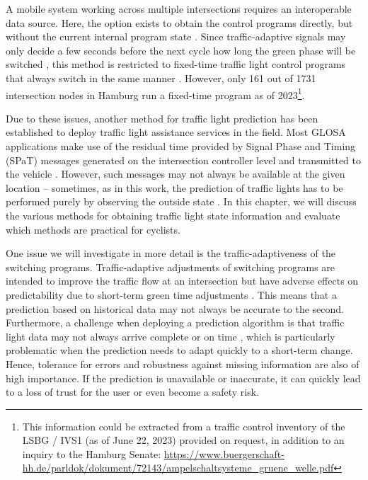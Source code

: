 A mobile system working across multiple intersections requires an interoperable data source. Here, the option exists to obtain the control programs directly, but without the current internal program state \cite{zweck_traffic_2013}. Since traffic-adaptive signals may only decide a few seconds before the next cycle how long the green phase will be switched \cite{islam_improved_2016}, this method is restricted to fixed-time traffic light control programs that always switch in the same manner \cite{zweck_traffic_2013}. However, only 161 out of 1731 intersection nodes in Hamburg run a fixed-time program as of 2023\footnote{This information could be extracted from a traffic control inventory of the LSBG / IVS1 (as of June 22, 2023) provided on request, in addition to an inquiry to the Hamburg Senate: \url{https://www.buergerschaft-hh.de/parldok/dokument/72143/ampelschaltsysteme_gruene_welle.pdf}}.

Due to these issues, another method for traffic light prediction has been established to deploy traffic light assistance services in the field. Most GLOSA applications make use of the residual time provided by Signal Phase and Timing (SPaT) messages generated on the intersection controller level and transmitted to the vehicle \cite{wagner_spatmap_2023}. However, such messages may not always be available at the given location -- sometimes, as in this work, the prediction of traffic lights has to be performed purely by observing the outside state \cite{protschky_extensive_2014, protschky_adaptive_2014}. In this chapter, we will discuss the various methods for obtaining traffic light state information and evaluate which methods are practical for cyclists.

One issue we will investigate in more detail is the traffic-adaptiveness of the switching programs. Traffic-adaptive adjustments of switching programs are intended to improve the traffic flow at an intersection but have adverse effects on predictability due to short-term green time adjustments \cite{schweiger_elisatm_2011, bodenheimer_enabling_2014}. This means that a prediction based on historical data may not always be accurate to the second. Furthermore, a challenge when deploying a prediction algorithm is that traffic light data may not always arrive complete or on time \cite{protschky_extensive_2014, protschky_adaptive_2014}, which is particularly problematic when the prediction needs to adapt quickly to a short-term change. Hence, tolerance for errors and robustness against missing information are also of high importance. If the prediction is unavailable or inaccurate, it can quickly lead to a loss of trust for the user or even become a safety risk.

